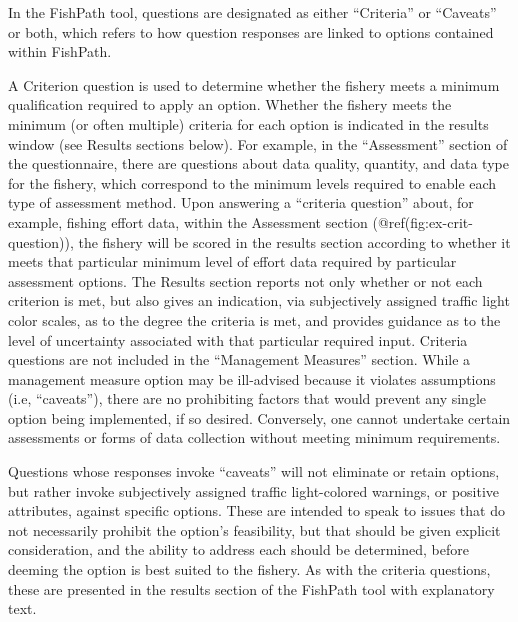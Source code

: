 \documentclass[11pt,]{book}
\begin{document}
In the FishPath tool, questions are designated as either ``Criteria'' or
``Caveats'' or both, which refers to how question responses are linked
to options contained within FishPath.

A Criterion question is used to determine whether the fishery meets a
minimum qualification required to apply an option. Whether the fishery
meets the minimum (or often multiple) criteria for each option is
indicated in the results window (see Results sections below). For
example, in the ``Assessment'' section of the questionnaire, there are
questions about data quality, quantity, and data type for the fishery,
which correspond to the minimum levels required to enable each type of
assessment method. Upon answering a ``criteria question'' about, for
example, fishing effort data, within the Assessment section
(@ref(fig:ex-crit-question)), the fishery will be scored in the results
section according to whether it meets that particular minimum level of
effort data required by particular assessment options. The Results
section reports not only whether or not each criterion is met, but also
gives an indication, via subjectively assigned traffic light color
scales, as to the degree the criteria is met, and provides guidance as
to the level of uncertainty associated with that particular required
input. Criteria questions are not included in the ``Management
Measures'' section. While a management measure option may be ill-advised
because it violates assumptions (i.e, ``caveats''), there are no
prohibiting factors that would prevent any single option being
implemented, if so desired. Conversely, one cannot undertake certain
assessments or forms of data collection without meeting minimum
requirements.

Questions whose responses invoke ``caveats'' will not eliminate or
retain options, but rather invoke subjectively assigned traffic
light-colored warnings, or positive attributes, against specific
options. These are intended to speak to issues that do not necessarily
prohibit the option's feasibility, but that should be given explicit
consideration, and the ability to address each should be determined,
before deeming the option is best suited to the fishery. As with the
criteria questions, these are presented in the results section of the
FishPath tool with explanatory text.
\end{document}
